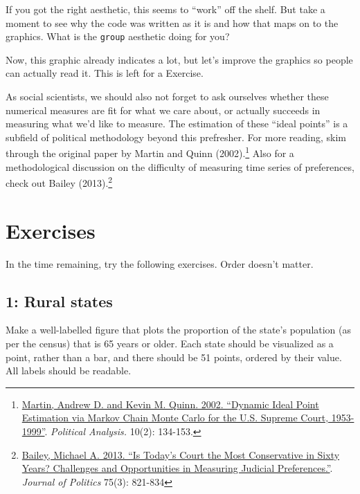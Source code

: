 \documentclass[]{book}
\let\rmarkdownfootnote\footnote%
\def\footnote{\protect\rmarkdownfootnote}
\theoremstyle{definition}
\theoremstyle{definition}
\theoremstyle{definition}
\theoremstyle{remark}
\begin{document}
If you got the right aesthetic, this seems to ``work'' off the shelf. But take a moment to see why the code was written as it is and how that maps on to the graphics. What is the \texttt{group} aesthetic doing for you?

Now, this graphic already indicates a lot, but let's improve the graphics so people can actually read it. This is left for a Exercise.

As social scientists, we should also not forget to ask ourselves whether these numerical measures are fit for what we care about, or actually succeeds in measuring what we'd like to measure. The estimation of these ``ideal points'' is a subfield of political methodology beyond this prefresher. For more reading, skim through the original paper by Martin and Quinn (2002).\footnote{\href{http://mqscores.lsa.umich.edu/media/pa02.pdf}{Martin, Andrew D. and Kevin M. Quinn. 2002. ``Dynamic Ideal Point Estimation via Markov Chain Monte Carlo for the U.S. Supreme Court, 1953-1999''}. \emph{Political Analysis.} 10(2): 134-153.} Also for a methodological discussion on the difficulty of measuring time series of preferences, check out Bailey (2013).\footnote{\href{https://michaelbailey.georgetown.domains/wp-content/uploads/2018/05/JOP_proofs_June2013.pdf}{Bailey, Michael A. 2013. ``Is Today's Court the Most Conservative in Sixty Years? Challenges and Opportunities in Measuring Judicial Preferences.''}. \emph{Journal of Politics} 75(3): 821-834}

\hypertarget{exercises-2}{%
\section*{Exercises}\label{exercises-2}}

In the time remaining, try the following exercises. Order doesn't matter.

\hypertarget{rural-states}{%
\subsection*{1: Rural states}\label{rural-states}}

Make a well-labelled figure that plots the proportion of the state's population (as per the census) that is 65 years or older. Each state should be visualized as a point, rather than a bar, and there should be 51 points, ordered by their value. All labels should be readable.
\end{document}
